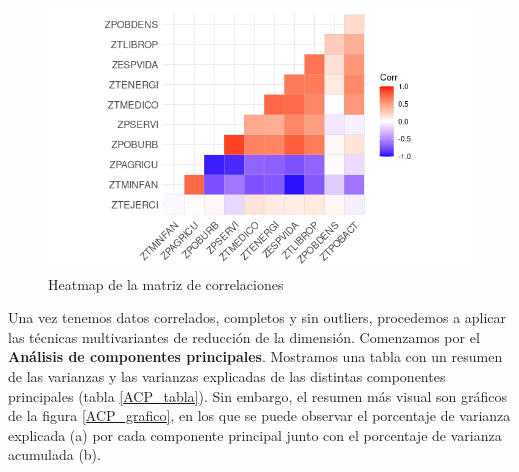 \documentclass[letterpaper,11pt]{article}
\begin{document}
\begin{figure}
\begin{center}
\includegraphics[scale=0.6]{./img/correlaciones.png}
\end{center}
\caption{Heatmap de la matriz de correlaciones}
\label{correlaciones}
\end{figure}

Una vez tenemos datos correlados, completos y sin outliers, procedemos a aplicar las técnicas multivariantes de reducción de la dimensión. Comenzamos por el \textbf{Análisis de componentes principales}. Mostramos una tabla con un resumen de las varianzas y las varianzas explicadas de las distintas componentes principales (tabla \ref{ACP_tabla}). Sin embargo, el resumen más visual son gráficos de la figura \ref{ACP_grafico}, en los que se puede observar el porcentaje de varianza explicada (a) por cada componente principal junto con el porcentaje de varianza acumulada (b).
\end{document}
